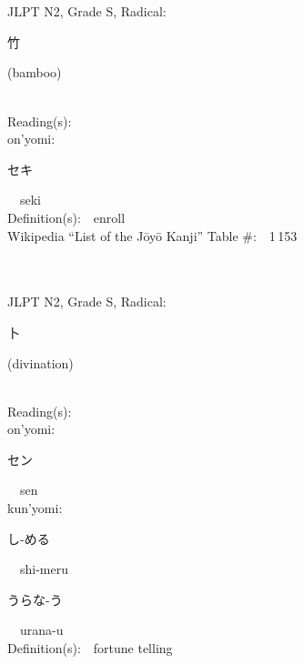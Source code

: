 \begin{multicols}{2}
\ \ \\
{\fontsize{34pt}{40pt}  }\ \ \\  %
{JLPT N2, Grade S, Radical:\ \ {\begin{CJK}{UTF8}{min} 竹 \end{CJK}} (bamboo) } \\
Reading(s):\ \ \\
{\hspace*{1em}}on'yomi:\ \ \\
{\hspace*{2em}}{\begin{CJK}{UTF8}{min} セキ \end{CJK}}\ \ seki\ \ \\
Definition(s):\ \ enroll \\
Wikipedia ``List of the J\=oy\=o Kanji'' Table \#:\ \ 1\,153 \\
\ \ \\
{\fontsize{34pt}{40pt}  }\ \ \\  %
{JLPT N2, Grade S, Radical:\ \ {\begin{CJK}{UTF8}{min} 卜 \end{CJK}} (divination) } \\
Reading(s):\ \ \\
{\hspace*{1em}}on'yomi:\ \ \\
{\hspace*{2em}}{\begin{CJK}{UTF8}{min} セン \end{CJK}}\ \ sen\ \ \\
{\hspace*{1em}}kun'yomi:\ \ \\
{\hspace*{2em}}{\begin{CJK}{UTF8}{min} し-める \end{CJK}}\ \ shi-meru\ \ \\
{\hspace*{2em}}{\begin{CJK}{UTF8}{min} うらな-う \end{CJK}}\ \ urana-u\ \ \\
Definition(s):\ \ fortune telling \\

\end{multicols}
